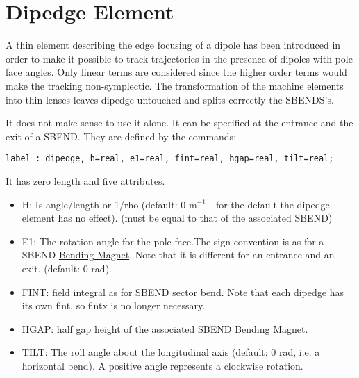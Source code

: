 
\section{Dipedge Element}

A thin element describing the edge focusing of a dipole has been
introduced in order to make it possible to track trajectories in the
presence of dipoles with pole face angles. Only linear terms are
considered since the higher order terms would make the tracking
non-symplectic. The transformation of the machine elements into thin
lenses leaves dipedge untouched and splits correctly the SBENDS's.  

It does not make sense to use it alone. It can be specified at the
entrance and the exit of a SBEND. They are defined by the commands:  
\begin{verbatim}
label : dipedge, h=real, e1=real, fint=real, hgap=real, tilt=real;
\end{verbatim} 

It has zero length and five attributes. 
\begin{itemize}
   \item H: Is angle/length or 1/rho (default: 0 m$^{-1}$ - for the
     default the dipedge element has no effect). (must be equal to that
     of the associated SBEND)  
   \item E1: The rotation angle for the pole face.The sign convention is
     as for a SBEND \href{bend.html}{Bending Magnet}. Note that it is
     different for an entrance and an exit. (default: 0 rad).  
   \item FINT: field integral as for SBEND
     \href{local_system.html#sbend}{sector bend}. Note that each dipedge
     has its own fint, so fintx is no longer necessary.  
   \item HGAP: half gap height of the associated SBEND
     \href{bend.html}{Bending Magnet}.   
   \item TILT: The roll angle about the longitudinal axis (default: 0
     rad, i.e. a horizontal bend). A positive angle represents a
     clockwise rotation.  
\end{itemize}

